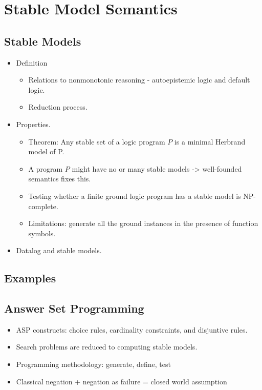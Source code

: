 \section{Stable Model Semantics}

\subsection{Stable Models}
\begin{itemize}
    \item Definition
        \begin{itemize}
            \item Relations to nonmonotonic reasoning - autoepistemic logic and default logic.
            \item Reduction process.
        \end{itemize}
    \item Properties.
        \begin{itemize}
            \item Theorem: Any stable set of a logic program $P$ is a minimal Herbrand model of P.
            \item A program $P$ might have no or many stable models -> well-founded semantics fixes this.
            \item Testing whether a finite ground logic program has a stable model is NP-complete.
            \item Limitations: generate all the ground instances in the presence of function symbols.
        \end{itemize}
    \item Datalog and stable models.
\end{itemize}

\subsection{Examples}

\subsection{Answer Set Programming}
\begin{itemize}
    \item ASP constructs: choice rules, cardinality constraints, and disjuntive rules. 
    \item Search problems are reduced to computing stable models.
    \item Programming methodology: generate, define, test
    \item Classical negation + negation as failure = closed world assumption
\end{itemize}
